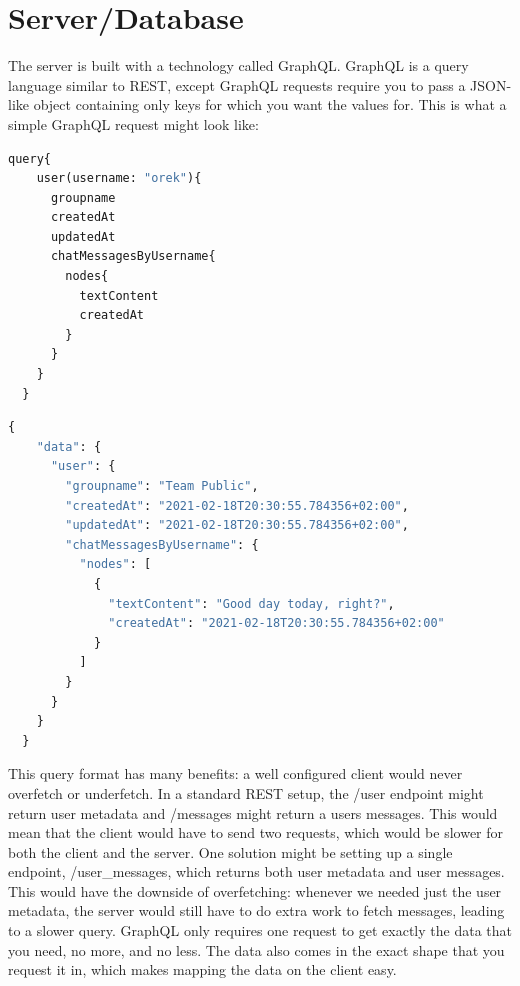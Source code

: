 \documentclass{l4proj}
\begin{document}
\section{Server/Database}
The server is built with a technology called GraphQL. GraphQL is a query language similar to REST, except GraphQL requests require you to pass a JSON-like object containing only keys for which you want the values for. This is what a simple GraphQL request might look like: 

\begin{lstlisting}[language=python, caption={An example GraphQL query fetching information about user "orek" and their messages }, label=lst:callahan]
  query{
    user(username: "orek"){
      groupname
      createdAt
      updatedAt
      chatMessagesByUsername{
        nodes{
          textContent
          createdAt
        }
      }
    }
  }
\end{lstlisting}

\begin{lstlisting}[language=python, caption={Server response to the above query}]
  {
    "data": {
      "user": {
        "groupname": "Team Public",
        "createdAt": "2021-02-18T20:30:55.784356+02:00",
        "updatedAt": "2021-02-18T20:30:55.784356+02:00",
        "chatMessagesByUsername": {
          "nodes": [
            {
              "textContent": "Good day today, right?",
              "createdAt": "2021-02-18T20:30:55.784356+02:00"
            }
          ]
        }
      }
    }
  }
\end{lstlisting}
This query format has many benefits: a well configured client would never overfetch or underfetch. In a standard REST setup, the /user endpoint might return user metadata and /messages might return a users messages. This would mean that the client would have to send two requests, which would be slower for both the client and the server. One solution might be setting up a single endpoint, /user\_messages, which returns both user metadata and user messages. This would have the downside of overfetching: whenever we needed just the user metadata, the server would still have to do extra work to fetch messages, leading to a slower query. GraphQL only requires one request to get exactly the data that you need, no more, and no less. The data also comes in the exact shape that you request it in, which makes mapping the data on the client easy. 
\end{document}
